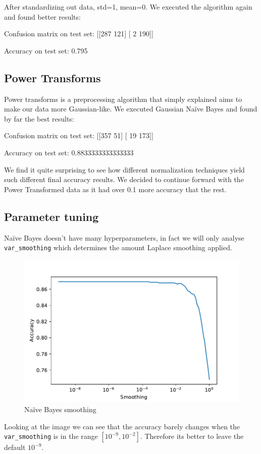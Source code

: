 After standardizing out data, std=1, mean=0. We executed the algorithm again and found better results:

Confusion matrix on test set:
 [[287 121]
 [  2 190]]

Accuracy on test set:  0.795

\subsection{Power Transforms}

Power transforms is a preprocessing algorithm that simply explained aims to make our data more Gaussian-like. We executed Gaussian Na\"ive Bayes and found by far the best results:

Confusion matrix on test set:
 [[357  51]
 [ 19 173]]

Accuracy on test set:  0.8833333333333333

We find it quite surprising to see how different normalization techniques yield such different final accuracy results. We decided to continue forward with the Power Transformed data as it had over 0.1
more accuracy that the rest.

\subsection{Parameter tuning}

Na\"ive Bayes doesn't have many hyperparameters, in fact we will only analyse \texttt{var\_smoothing} which determines the amount Laplace smoothing applied.

\begin{figure}[H]
    \centering
    \includegraphics{figures/naive_bayes_smoothing_cv.pdf}
    \caption{Na\"ive Bayes smoothing}%
    \label{fig:naive_bayes_smoothing_cv}
\end{figure}

Looking at the image we can see that the accuracy barely changes when the \texttt{var\_smoothing} is in the range $[10^{-9}, 10^{-2}]$. Therefore its better to leave the default $10^{-9}$.
